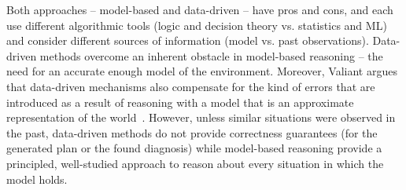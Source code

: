 \documentclass[12pt]{article}
\begin{document}
Both approaches -- model-based and data-driven --  have pros and cons, and each use different algorithmic tools (logic and decision theory vs. statistics and ML) and consider different sources of information (model vs. past observations). Data-driven methods overcome an inherent obstacle in model-based reasoning -- the need for an accurate enough model of the environment. Moreover, Valiant argues that  data-driven mechanisms also compensate for the kind of errors that are introduced as a result of  reasoning with a model that is an approximate representation of the world~\cite{valiant2000neuroidal,valiant2000robustLogics}.
However, unless similar situations were observed in the past, data-driven methods do not provide correctness guarantees (for the generated plan or the found diagnosis)  
while model-based reasoning provide a principled,  well-studied approach to reason about every situation in which the model holds. %



 
\end{document}
